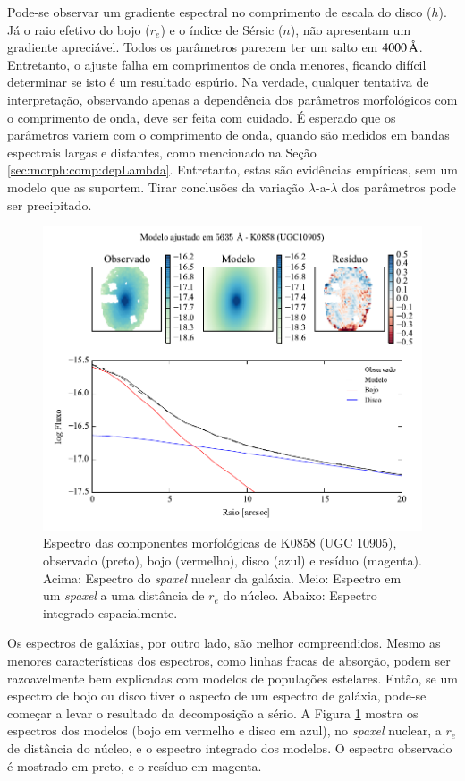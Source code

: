 Pode-se observar um gradiente espectral no comprimento de escala do disco ($h$).
Já o raio efetivo do bojo ($r_e$) e o índice de Sérsic ($n$), não apresentam um
gradiente apreciável. Todos os parâmetros parecem ter um salto em
$4000\,\text{\normalfont\AA}$. Entretanto, o ajuste falha em comprimentos de onda menores,
ficando difícil determinar se isto é um resultado espúrio. Na verdade, qualquer
tentativa de interpretação, observando apenas a dependência dos parâmetros
morfológicos com o comprimento de onda, deve ser feita com cuidado. É esperado
que os parâmetros variem com o comprimento de onda, quando são medidos em bandas
espectrais largas e distantes, como mencionado na Seção
\ref{sec:morph:comp:depLambda}. Entretanto, estas são evidências empíricas, sem
um modelo que as suportem. Tirar conclusões da variação $\lambda$-a-$\lambda$
dos parâmetros pode ser precipitado.

\begin{figure}
	\includegraphics[page=4]{figuras-decomp/K0858_sample006a}
	\caption[Espectro das componentes morfológicas de K0858 (UGC 10905). Acima,
	espectros] {Espectro das componentes morfológicas de K0858 (UGC 10905),
	observado (preto), bojo (vermelho), disco (azul) e resíduo (magenta). Acima:
	Espectro do {\em spaxel} nuclear da galáxia. Meio: Espectro em um {\em spaxel}
	a uma distância de $r_e$ do núcleo. Abaixo: Espectro integrado espacialmente.}
	\label{fig:decompSpectra}
\end{figure}

Os espectros de galáxias, por outro lado, são melhor compreendidos. Mesmo as
menores características dos espectros, como linhas fracas de absorção, podem ser
razoavelmente bem explicadas com modelos de populações estelares. Então, se um
espectro de bojo ou disco tiver o aspecto de um espectro de galáxia, pode-se
começar a levar o resultado da decomposição a sério. A Figura
\ref{fig:decompSpectra} mostra os espectros dos modelos (bojo em vermelho e
disco em azul), no {\em spaxel} nuclear, a $r_e$ de distância do núcleo, e o
espectro integrado dos modelos. O espectro observado é mostrado em preto, e o
resíduo em magenta.


